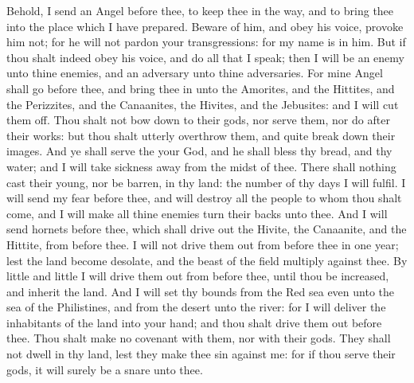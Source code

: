 \begin{biblechapter}
 Behold, I send an Angel before thee, to keep thee in the way, and to bring thee into the place which I have prepared.
\verse Beware of him, and obey his voice, provoke him not; for he will not pardon your transgressions: for my name is in him.
\verse But if thou shalt indeed obey his voice, and do all that I speak; then I will be an enemy unto thine enemies, and an adversary unto thine adversaries.
\verse For mine Angel shall go before thee, and bring thee in unto the Amorites, and the Hittites, and the Perizzites, and the Canaanites, the Hivites, and the Jebusites: and I will cut them off.
\verse Thou shalt not bow down to their gods, nor serve them, nor do after their works: but thou shalt utterly overthrow them, and quite break down their images.
\verse And ye shall serve the \LORD your God, and he shall bless thy bread, and thy water; and I will take sickness away from the midst of thee.
\verse There shall nothing cast their young, nor be barren, in thy land: the number of thy days I will fulfil.
\verse I will send my fear before thee, and will destroy all the people to whom thou shalt come, and I will make all thine enemies turn their backs unto thee.
\verse And I will send hornets before thee, which shall drive out the Hivite, the Canaanite, and the Hittite, from before thee.
\verse I will not drive them out from before thee in one year; lest the land become desolate, and the beast of the field multiply against thee.
\verse By little and little I will drive them out from before thee, until thou be increased, and inherit the land.
\verse And I will set thy bounds from the Red sea even unto the sea of the Philistines, and from the desert unto the river: for I will deliver the inhabitants of the land into your hand; and thou shalt drive them out before thee.
\verse Thou shalt make no covenant with them, nor with their gods.
\verse They shall not dwell in thy land, lest they make thee sin against me: for if thou serve their gods, it will surely be a snare unto thee.
\end{biblechapter}

